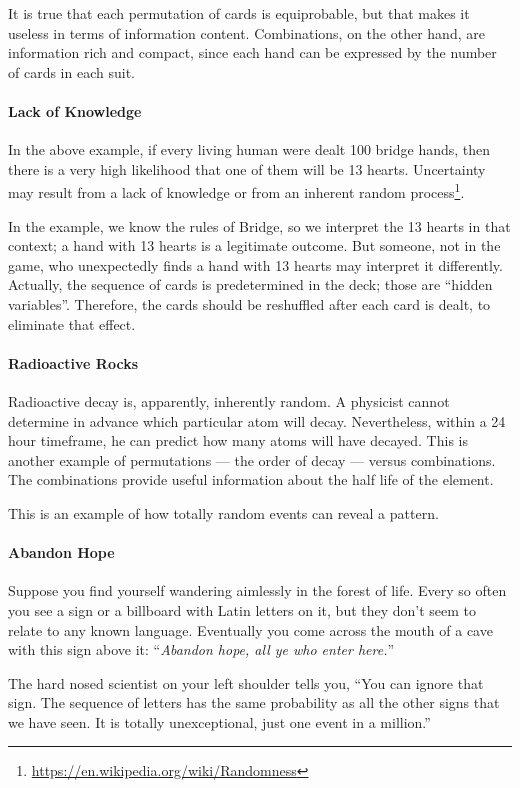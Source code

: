 It is true that each permutation of cards is equiprobable, but that makes it useless in terms of information content.
Combinations, on the other hand, are information rich and compact, since each hand can be expressed by the number of
cards in each suit.

\paragraph{Lack of Knowledge}
In the above example, if every living human were dealt 100 bridge hands, then there is a very high likelihood that one
of them will be 13 hearts. Uncertainty may result from a lack of knowledge or from an inherent random process\footnote{\url{https://en.wikipedia.org/wiki/Randomness}}.

In the example, we know the rules of Bridge, so we interpret the 13 hearts in that context; a hand with 13 hearts is a
legitimate outcome. But someone, not in the game, who unexpectedly finds a hand with 13 hearts may interpret it
differently. Actually, the sequence of cards is predetermined in the deck; those are “hidden variables”. Therefore, the
cards should be reshuffled after each card is dealt, to eliminate that effect.

\paragraph{Radioactive Rocks}
Radioactive decay is, apparently, inherently random. A physicist cannot determine in advance which particular atom will
decay. Nevertheless, within a 24 hour timeframe, he can predict how many atoms will have decayed. This is another
example of permutations — the order of decay — versus combinations. The combinations provide
useful information about the half life of the element.

This is an example of how totally random events can reveal a pattern.

\paragraph{Abandon Hope}
Suppose you find yourself wandering aimlessly in the forest of life. Every so often you see a sign or a billboard with
Latin letters on it, but they don't seem to relate to any known language. Eventually you come across the
mouth of a cave with this sign above it: “\emph{Abandon hope, all ye who enter here.}”

The hard nosed scientist on your left shoulder tells you, “You can ignore that sign. The sequence of letters has the
same probability as all the other signs that we have seen. It is totally unexceptional, just one event in a million.”

